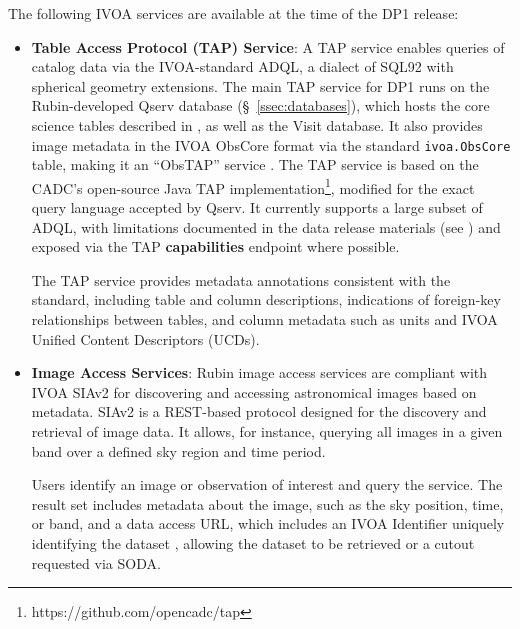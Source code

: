 The following \gls{IVOA} services are available at the time of the DP1 release:
\begin{itemize}
\vspace{0.1cm}
\item \textbf{Table Access Protocol (TAP) Service}: A TAP service \citep{2019ivoa.spec.0927D} enables queries of catalog data via the IVOA-standard \gls{ADQL}, a dialect of SQL92 with spherical geometry extensions.
The main \gls{TAP} service for \gls{DP1} runs on the Rubin-developed \gls{Qserv} database (\S~\ref{ssec:databases}), which hosts the core science tables described in , as well as the Visit database.
It also provides image metadata in the IVOA ObsCore format via the standard \texttt{ivoa.ObsCore} table, making it an ``ObsTAP'' service \citep[ObsTAP;][]{2017ivoa.spec.0509L}.
The TAP service is based on the \gls{CADC}'s open-source Java TAP implementation\footnote{https://github.com/opencadc/tap}, modified for the exact query language accepted by Qserv.
It currently supports a large subset of ADQL, with limitations documented in the data release materials (see ) and exposed via the TAP \textbf{capabilities} endpoint where possible. \

The TAP service provides metadata annotations consistent with the standard, including table and column descriptions, indications of foreign-key relationships between tables, and column metadata such as units and \gls{IVOA} Unified Content Descriptors (UCDs).

\vspace{0.1cm}
\item \textbf{Image Access Services}: Rubin image access services are compliant with \gls{IVOA} SIAv2 \citep[Simple Image Access Protocol, version 2;][]{2025arXiv250100544J,2015ivoa.spec.1223D}
for discovering and accessing astronomical images based on \gls{metadata}.
SIAv2 is a \gls{REST}-based protocol designed for the discovery and retrieval of image data. It allows, for instance, querying all images in a given band over a defined sky region and time period.

Users identify an image or observation of interest and query the service.
The result set includes \gls{metadata} about the image, such as the sky position, time, or band, and a data access URL, which includes an IVOA Identifier uniquely identifying the dataset \citep{DMTN-302}, allowing the dataset to be retrieved or a cutout requested via \gls{SODA}.


\end{itemize}
